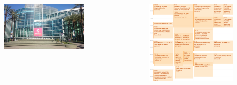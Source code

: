 {\begin{minipage}[0.2\textheight]{\textwidth}
\begin{columns}[T]
\begin{column}{0.6\textwidth}
    			\centering
    			\includegraphics[width=0.7\textwidth]{img/confcenter.jpg}
  					\end{column}
  					\begin{column}{0.4\textwidth}  			
  						\begin{figure}
  							\centering
  							\includegraphics[width=\textwidth]{img/cal2.png}
  						\end{figure}
  					\end{column}
  				\end{columns}
  			\end{minipage}
}
